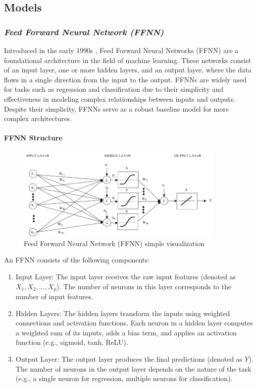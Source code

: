 \documentclass{article}
\begin{document}
\subsection{Models}

\subsubsection{\emph{Feed Forward Neural Network (FFNN)}}
Introduced in the early 1990s \cite{ffnn_orig}, Feed Forward Neural Networks (FFNN) are a foundational architecture in the field of machine learning. These networks consist of an input layer, one or more hidden layers, and an output layer, where the data flows in a single direction from the input to the output. FFNNs are widely used for tasks such as regression and classification due to their simplicity and effectiveness in modeling complex relationships between inputs and outputs. Despite their simplicity, FFNNs serve as a robust baseline model for more complex architectures.

\paragraph{FFNN Structure}
    \begin{figure}[H]
        \centering
        \includegraphics[width=0.9\textwidth]{ffnn.png}
        \caption{Feed Forward Neural Network (FFNN) simple visualization \cite{ffnn_structure}}
        \label{fig:enter-label}
    \end{figure}

    An FFNN consists of the following components:

    \begin{enumerate}[label={(\arabic*)}]
        \item Input Layer: The input layer receives the raw input features (denoted as $X_1, X_2, \ldots, X_p$). The number of neurons in this layer corresponds to the number of input features.
        
        \item Hidden Layers: The hidden layers transform the inputs using weighted connections and activation functions. Each neuron in a hidden layer computes a weighted sum of its inputs, adds a bias term, and applies an activation function (e.g., sigmoid, tanh, ReLU).
        
        \item Output Layer: The output layer produces the final predictions (denoted as $Y$). The number of neurons in the output layer depends on the nature of the task (e.g., a single neuron for regression, multiple neurons for classification).
    \end{enumerate}
\end{document}
